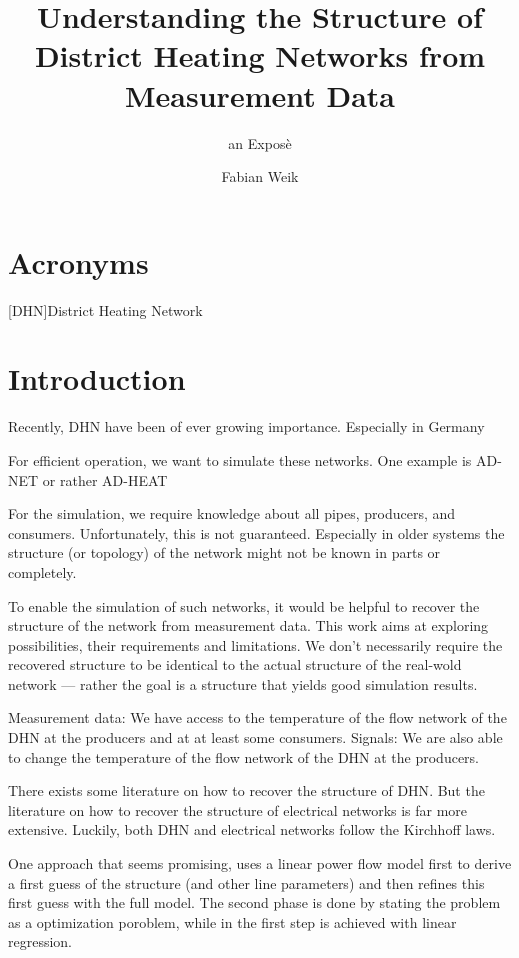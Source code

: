 \documentclass{scrartcl}
\title{Understanding the Structure of District Heating Networks from Measurement Data}
\subtitle{an Exposè}
\author{Fabian Weik}
\begin{document}
    \maketitle

    \section{Acronyms}

    \begin{acronym}
        [DHN]{District Heating Network}
    \end{acronym}

    \section{Introduction}

    Recently, \ac{DHN} have been of ever growing importance.
    Especially in Germany

    For efficient operation, we want to simulate these networks.
    One example is AD-NET or rather AD-HEAT

    For the simulation, we require knowledge about all pipes, producers, and consumers.
    Unfortunately, this is not guaranteed.
    Especially in older systems the structure (or topology) of the network might not be known in parts or completely.

    To enable the simulation of such networks, it would be helpful to recover the structure of the network from measurement data.
    This work aims at exploring possibilities, their requirements and limitations.
    We don't necessarily require the recovered structure to be identical to the actual structure of the real-wold network --- rather  the goal is a structure that yields good simulation results.

    Measurement data: We have access to the temperature of the flow network of the \ac{DHN} at the producers and at at least some consumers.
    Signals: We are also able to change the temperature of the flow network of the \ac{DHN} at the producers.

    There exists some literature on how to recover the structure of \ac{DHN}.
    But the literature on how to recover the structure of electrical networks is far more extensive.
    Luckily, both \ac{DHN} and electrical networks follow the Kirchhoff laws.

    One approach that seems promising, uses a linear power flow model first to derive a first guess of the structure (and other line parameters) and then refines this first guess with the full model.
    The second phase is done by stating the problem as a optimization poroblem, while in the first step is achieved with linear regression.
\end{document}
